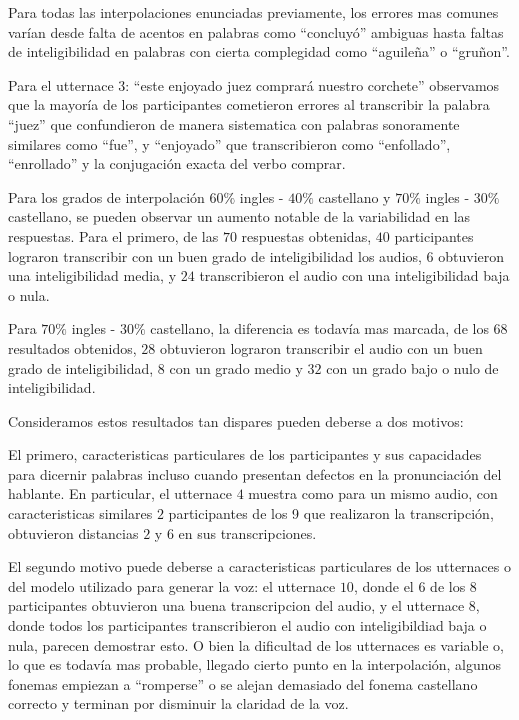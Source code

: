 Para todas las interpolaciones enunciadas previamente, los errores mas comunes varían desde falta de acentos en palabras como ``concluyó'' ambiguas hasta faltas de inteligibilidad en palabras con cierta complegidad como ``aguileña'' o ``gruñon''.

Para el utternace 3: ``este enjoyado juez comprará nuestro corchete'' observamos que la mayoría de los participantes cometieron errores al transcribir la palabra ``juez'' que confundieron de manera sistematica con palabras sonoramente similares como ``fue'', y ``enjoyado'' que transcribieron como ``enfollado'', ``enrollado'' y la conjugación exacta del verbo comprar.

Para los grados de interpolación $60\%$ ingles - $40\%$ castellano y $70\%$ ingles - $30\%$ castellano, se pueden observar un aumento notable de la variabilidad en las respuestas. Para el primero, de las $70$ respuestas obtenidas, $40$ participantes lograron transcribir con un buen grado de inteligibilidad los audios, $6$ obtuvieron una inteligibilidad media, y $24$ transcribieron el audio con una inteligibilidad baja o nula.

Para $70\%$ ingles - $30\%$ castellano, la diferencia es todavía mas marcada, de los $68$ resultados obtenidos, $28$ obtuvieron lograron transcribir el audio con un buen grado de inteligibilidad, $8$ con un grado medio y $32$ con un grado bajo o nulo de inteligibilidad.

Consideramos estos resultados tan dispares pueden deberse a dos motivos:

El primero, caracteristicas particulares de los participantes y sus capacidades para dicernir palabras incluso cuando presentan defectos en la pronunciación del hablante. En particular, el utternace $4$ muestra como para un mismo audio, con caracteristicas similares $2$ participantes de los 9 que realizaron la transcripción, obtuvieron distancias $2$ y $6$ en sus transcripciones.

El segundo motivo puede deberse a caracteristicas particulares de los utternaces o del modelo utilizado para generar la voz: el utternace $10$, donde el $6$ de los $8$ participantes obtuvieron una buena transcripcion del audio, y el utternace $8$, donde todos los participantes transcribieron el audio con inteligibildiad baja o nula, parecen demostrar esto. O bien la dificultad de los utternaces es variable o, lo que es todavía mas probable, llegado cierto punto en la interpolación, algunos fonemas empiezan a ``romperse'' o se alejan demasiado del fonema castellano correcto y terminan por disminuir la claridad de la voz.



